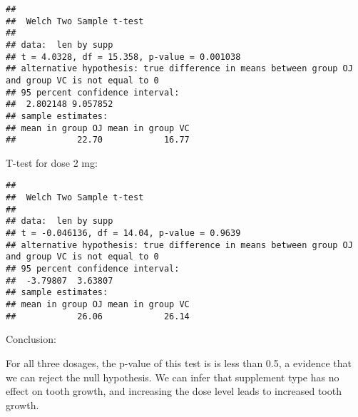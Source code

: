 \documentclass[
]{article}
\newenvironment{Shaded}{\begin{snugshade}}{\end{snugshade}}
\newcommand{\DecValTok}[1]{\textcolor[rgb]{0.00,0.00,0.81}{#1}}
\newcommand{\FunctionTok}[1]{\textcolor[rgb]{0.13,0.29,0.53}{\textbf{#1}}}
\newcommand{\NormalTok}[1]{#1}
\newcommand{\SpecialCharTok}[1]{\textcolor[rgb]{0.81,0.36,0.00}{\textbf{#1}}}
\begin{document}
\begin{Shaded}
\end{Shaded}

\begin{verbatim}
## 
##  Welch Two Sample t-test
## 
## data:  len by supp
## t = 4.0328, df = 15.358, p-value = 0.001038
## alternative hypothesis: true difference in means between group OJ and group VC is not equal to 0
## 95 percent confidence interval:
##  2.802148 9.057852
## sample estimates:
## mean in group OJ mean in group VC 
##            22.70            16.77
\end{verbatim}

T-test for dose 2 mg:

\begin{Shaded}
\end{Shaded}

\begin{verbatim}
## 
##  Welch Two Sample t-test
## 
## data:  len by supp
## t = -0.046136, df = 14.04, p-value = 0.9639
## alternative hypothesis: true difference in means between group OJ and group VC is not equal to 0
## 95 percent confidence interval:
##  -3.79807  3.63807
## sample estimates:
## mean in group OJ mean in group VC 
##            26.06            26.14
\end{verbatim}

Conclusion:

For all three dosages, the p-value of this test is is less than 0.5, a
evidence that we can reject the null hypothesis. We can infer that
supplement type has no effect on tooth growth, and increasing the dose
level leads to increased tooth growth.
\end{document}
